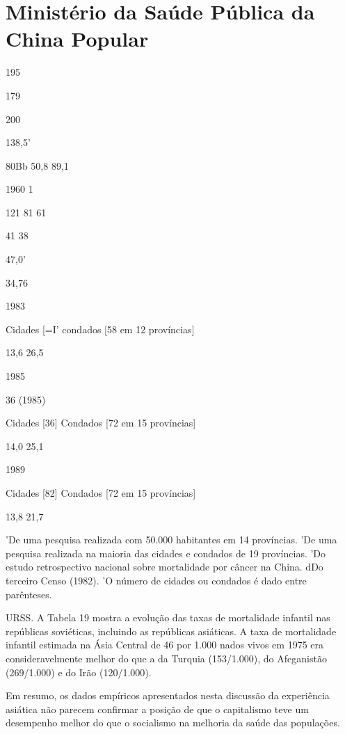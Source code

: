 {{{\section{Ministério da Saúde Pública da China Popular}
 \par 
195
 \par 
179
 \par 
200
 \par 
138,5'
 \par 
80Bb 50,8 89,1
 \par 
1960 1%
 \par 
121 {\color{blue}81} {\color{blue}61}
 \par 
41 {\color{blue}38}
 \par 
47,0'
 \par 
34,76
 \par 
1983
 \par 
Cidades [=I' condados [58 em {\color{blue}12} províncias]
 \par 
13,6 26,5
 \par 
1985
 \par 
36 (1985)
 \par 
Cidades [36] Condados [72 em {\color{blue}15} províncias]
 \par 
14,0 25,1
 \par 
1989
 \par 
Cidades [82] Condados [72 em {\color{blue}15} províncias]
 \par 
13,8 21,7
 \par 
'De uma pesquisa realizada com {\color{blue}50}.{\color{blue}000} habitantes em {\color{blue}14} províncias. 'De uma pesquisa realizada na maioria das cidades e condados de {\color{blue}19} províncias. 'Do estudo retrospectivo nacional sobre mortalidade por câncer na China. dDo terceiro Censo (1982). 'O número de cidades ou condados é dado entre parênteses.
 \par 
URSS. A Tabela {\color{blue}19} mostra a evolução das taxas de mortalidade infantil nas repúblicas soviéticas, incluindo as repúblicas asiáticas. A taxa de mortalidade infantil estimada na Ásia Central de {\color{blue}46} por {\color{blue}1}.{\color{blue}000} nados vivos em 1975 era consideravelmente melhor do que a da Turquia (153/1.{\color{blue}000}), do Afeganistão (269/1.{\color{blue}000}) e do Irão (120/1.{\color{blue}000}).
 \par 
Em resumo, os dados empíricos apresentados nesta discussão da experiência asiática não parecem confirmar a posição de que o capitalismo teve um desempenho melhor do que o socialismo na melhoria da saúde das populações.
 \par 
}}}

